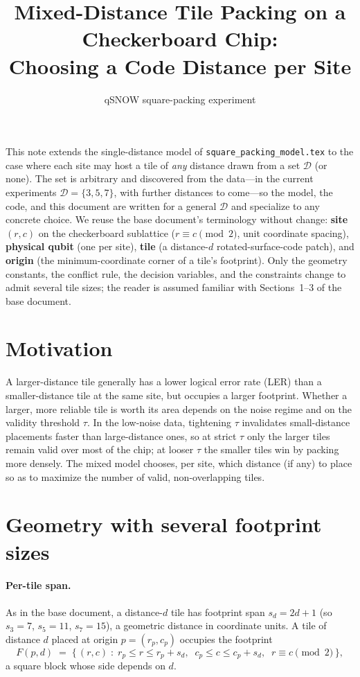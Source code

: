 \documentclass[11pt]{article}
\title{Mixed-Distance Tile Packing on a Checkerboard Chip:\\
Choosing a Code Distance per Site}
\author{qSNOW square-packing experiment}
\date{}
\newcommand{\Dset}{\mathcal{D}}
\newcommand{\Fp}{F}
\begin{document}
\maketitle

This note extends the single-distance model of \texttt{square\_packing\_model.tex}
to the case where each site may host a tile of \emph{any} distance drawn from a set
$\Dset$ (or none). The set is arbitrary and discovered from the data---in the
current experiments $\Dset = \{3, 5, 7\}$, with further distances to come---so the
model, the code, and this document are written for a general $\Dset$ and specialize
to any concrete choice. We reuse the base document's terminology without change:
\textbf{site} $(r,c)$ on the checkerboard sublattice ($r \equiv c \pmod 2$, unit
coordinate spacing), \textbf{physical qubit} (one per site), \textbf{tile}
(a distance-$d$ rotated-surface-code patch), and \textbf{origin} (the
minimum-coordinate corner of a tile's footprint). Only the geometry constants,
the conflict rule, the decision variables, and the constraints change to admit
several tile sizes; the reader is assumed familiar with Sections~1--3 of the base
document.

\section{Motivation}

A larger-distance tile generally has a lower logical error rate (LER) than a
smaller-distance tile at the same site, but occupies a larger footprint. Whether a
larger, more reliable tile is worth its area depends on the noise regime and on
the validity threshold $\tau$. In the low-noise data, tightening $\tau$ invalidates
small-distance placements faster than large-distance ones, so at strict $\tau$ only
the larger tiles remain valid over most of the chip; at looser $\tau$ the smaller
tiles win by packing more densely. The mixed model chooses, per site, which
distance (if any) to place so as to maximize the number of valid, non-overlapping
tiles.

\section{Geometry with several footprint sizes}
\label{sec:geometry}

\paragraph{Per-tile span.}
As in the base document, a distance-$d$ tile has footprint span $s_d = 2d + 1$
(so $s_3 = 7$, $s_5 = 11$, $s_7 = 15$), a geometric distance in coordinate units.
A tile of distance $d$ placed at origin $p = (r_p, c_p)$ occupies the footprint
\[
  \Fp(p, d) \;=\; \bigl\{\, (r, c) \;:\; r_p \le r \le r_p + s_d,\;\;
  c_p \le c \le c_p + s_d,\;\; r \equiv c \!\!\pmod 2 \,\bigr\},
\]
a square block whose side depends on $d$.
\end{document}
